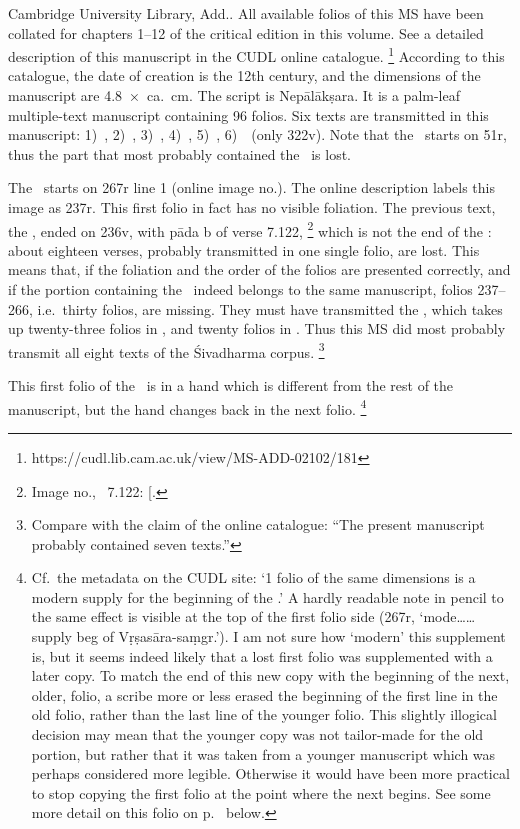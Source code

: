 Cambridge University Library, Add.. 
All available folios of this MS have been collated for 
chapters 1--12 of the critical edition in this volume. 
See a detailed description of this manuscript 
in the CUDL online catalogue.%
	\footnote{https://cudl.lib.cam.ac.uk/view/MS-ADD-02102/181}
According to this catalogue, the date of creation is the 12th
century, and the dimensions of the manuscript are 
4.8~×~ca.~cm. 
The script is Nepālākṣara. It is a palm-leaf multiple-text manuscript
containing 96 folios. Six texts are transmitted in this manuscript: 
1)~\SDhU,
2)~\SDhSangr,
3)~\Ums,
4)~\SivaUp,
5)~\Vss,
6)~\DharmP\ (only \fol322v). 
Note that the \SDhU\ starts on \fol51r, thus the part that most probably contained the \SDhS\ is lost.

The \VSS\ starts on \fol267r line 1 
(online image no.). 
The online description labels this image as \fol237r. 
This first folio in fact has no visible foliation.
The previous text, the \SivaUp,
ended on \fol236v, with pāda b of verse 7.122,%
 		\footnote{Image no., 
                  \SivaUp\ 7.122: 
                  {[}\skt{prāsā}{]}.}
which is not the end of the \SivaUp: 
about eighteen verses, probably transmitted 
in one single folio, are lost.
This means that, if the foliation and the order of the folios
are presented correctly, and if the portion containing
the \VSS\ indeed belongs to the same manuscript, 
folios 237--266, i.e.\ thirty folios, are missing. 
They must have transmitted the \Uums, 
which takes up twenty-three folios in \msCa, and twenty folios in \msCb.
Thus this MS did most probably transmit all eight texts of the
Śivadharma corpus.%
	\footnote{Compare with the claim of the online catalogue:
		``The present manuscript probably contained seven texts.''}	

This first folio of the \VSS\ is in a hand which is different from the
rest of the manuscript, but the hand changes back in the next folio.\label{msCcfirstfolio}%
	\footnote{Cf.~the metadata on the CUDL site: 
	`1 folio of the same dimensions is a modern supply for the 
	beginning of the .' A hardly readable 
	note in pencil to the same effect is visible at the
    top of the first folio side (\fol267r, `mode\ldots\ldots 
    supply beg of Vṛṣasāra-saṃgr.'). I am not sure how `modern'   
    this supplement is, but it seems indeed likely that a lost 
    first folio was supplemented
    with a later copy. To match the end of this new copy with the
   beginning of the next, older, folio, a scribe more or less erased   
   the beginning of the first line in the old folio, 
   rather than the last line
   of the younger folio. 
   This slightly illogical decision may mean that the younger
   copy was not tailor-made for the old portion, 
   but rather that it was
   taken from a younger manuscript which was 
   perhaps considered more legible. 
   Otherwise it would have been more practical to stop copying
   the first folio at the point where the next begins.
   See some more detail on this folio on
    p.~\pageref{msCcfirstfoliokakapada} below.}




